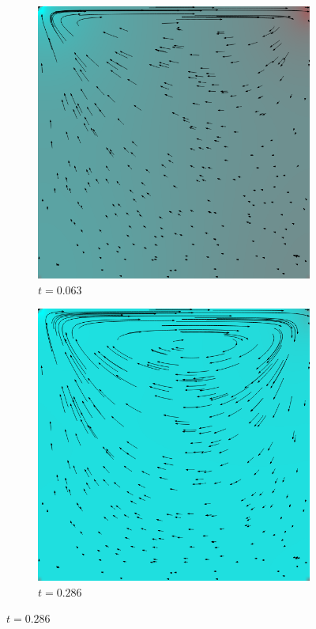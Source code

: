 		\begin{figure}[!htb]
			\centering
			\begin{subfigure}[b]{.5\textwidth}
				\includegraphics[scale = 0.28]{screenshots/periodic-00063.png}
				\caption{$t=0.063$}
			\end{subfigure}%
			\begin{subfigure}[b]{.5\textwidth}
				\includegraphics[scale = 0.28]{screenshots/periodic-00286.png}
				\caption{$t=0.286$}
			\end{subfigure}


\end{figure}
